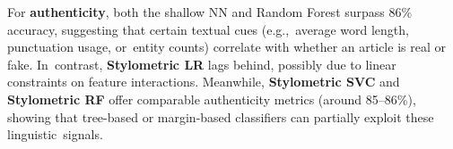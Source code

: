 \documentclass[electronics,article,accept,pdftex,moreauthors,electronics]{Definitions/mdpi}
\begin{document}
\begin{table}[H]
\tablesize{\small}
\caption{\hl{Accuracy}%
, precision, recall, and~F1 (weighted and macro) for \textbf{stylometric-based} classification. Each method uses only the stylometric feature vectors (no TF-IDF or deep embeddings).}
\label{tab:stylometric_results}
\end{table}



For \textbf{authenticity}, both the shallow NN and Random Forest surpass 86\% accuracy, suggesting that certain textual cues (e.g.,~average word length, punctuation usage, or~entity counts) correlate with whether an article is real or fake. In~contrast, \textbf{Stylometric LR} lags behind, possibly due to linear constraints on feature interactions. Meanwhile, \textbf{Stylometric SVC} and \textbf{Stylometric RF} offer comparable authenticity metrics (around 85--86\%), showing that tree-based or margin-based classifiers can partially exploit these linguistic~signals.
\end{document}
